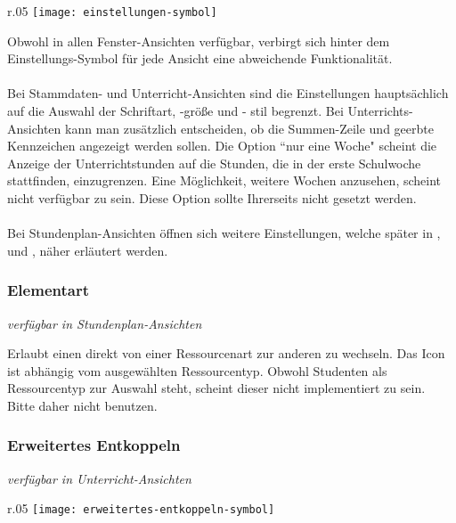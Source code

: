 \begin{wrapfigure}{r}{.05\textwidth}
	\vspace{-50pt}
	\texttt{[image: einstellungen-symbol]}
	\vspace{-35pt}
\end{wrapfigure}

\noindent
Obwohl in allen Fenster-Ansichten verfügbar, verbirgt sich hinter dem Einstellungs-Symbol für jede Ansicht eine abweichende Funktionalität.\\
\\
Bei Stammdaten- und Unterricht-Ansichten sind die Einstellungen hauptsächlich auf die Auswahl der Schriftart, -größe und - stil begrenzt. Bei Unterrichts-Ansichten kann man zusätzlich entscheiden, ob die Summen-Zeile und geerbte Kennzeichen angezeigt werden sollen. Die Option ``nur eine Woche" \hspace{1pt} scheint die Anzeige der Unterrichtstunden auf die Stunden, die in der erste Schulwoche stattfinden, einzugrenzen. Eine Möglichkeit, weitere Wochen anzusehen, scheint nicht verfügbar zu sein. Diese Option sollte Ihrerseits nicht gesetzt werden.\\
\\
Bei Stundenplan-Ansichten öffnen sich weitere Einstellungen, welche später in , und , näher erläutert werden.

\subsubsection{Elementart}
{\small\textit{verfügbar in Stundenplan-Ansichten\\}\par}

\noindent %
Erlaubt einen direkt von einer Ressourcenart zur anderen zu wechseln. Das Icon ist abhängig vom ausgewählten Ressourcentyp. Obwohl Studenten als Ressourcentyp zur Auswahl steht, scheint dieser nicht implementiert zu sein. Bitte daher nicht benutzen.

\subsubsection{Erweitertes Entkoppeln}
{\small\textit{verfügbar in Unterricht-Ansichten\\}\par}

\begin{wrapfigure}{r}{.05\textwidth}
	\vspace{-50pt}
	\texttt{[image: erweitertes-entkoppeln-symbol]}
	\vspace{-35pt}
\end{wrapfigure}

